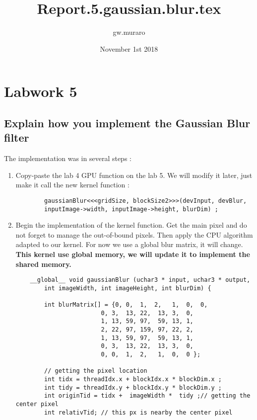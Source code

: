 \documentclass{article}
\title{Report.5.gaussian.blur.tex}
\author{gw.muraro}
\date{November 1st 2018}
\begin{document}
\maketitle
\section{Labwork 5}

\subsection{Explain how you implement the Gaussian Blur filter}
    
    The implementation was in several steps :

    \begin{enumerate}     

    \item
     Copy-paste the lab 4 GPU function on the lab 5. We will modify it later, just make it call the new kernel function : 
    \begin{verbatim}
        gaussianBlur<<<gridSize, blockSize2>>>(devInput, devBlur,
        inputImage->width, inputImage->height, blurDim) ; 
    \end{verbatim}
    
    \item 
    Begin the implementation of the kernel function. Get the main pixel and do not forget to manage the out-of-bound pixels. Then apply the CPU algorithm adapted to our kernel. For now we use a global blur matrix, it will change. \textbf{This kernel use global memory, we will update it to implement the shared memory.}
    
    \begin{verbatim}
    __global__ void gaussianBlur (uchar3 * input, uchar3 * output, 
        int imageWidth, int imageHeight, int blurDim) {

        int blurMatrix[] = {0, 0,  1,  2,   1,  0,  0,  
                     	0, 3,  13, 22,  13, 3,  0,  
                     	1, 13, 59, 97,  59, 13, 1,  
                     	2, 22, 97, 159, 97, 22, 2,  
                     	1, 13, 59, 97,  59, 13, 1,  
                     	0, 3,  13, 22,  13, 3,  0,
                     	0, 0,  1,  2,   1,  0,  0 };
	
	    // getting the pixel location 
	    int tidx = threadIdx.x + blockIdx.x * blockDim.x ;
	    int tidy = threadIdx.y + blockIdx.y * blockDim.y ;
	    int originTid = tidx +  imageWidth *  tidy ;// getting the center pixel 	
	    int relativTid; // this px is nearby the center pixel


\end{verbatim}
\end{enumerate}
\end{document}
